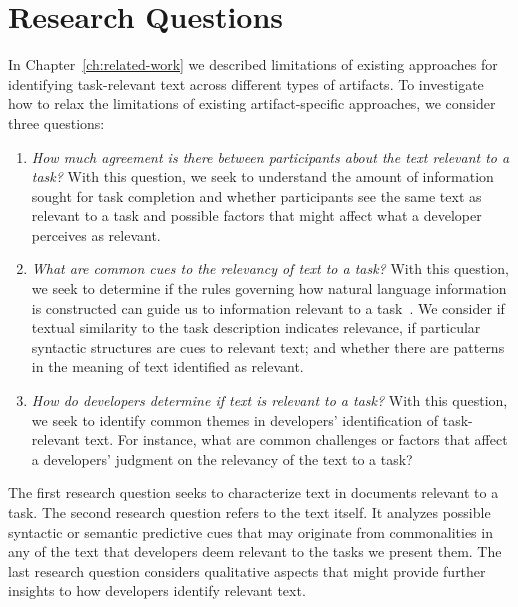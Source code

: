 \section{Research Questions}
\label{cp3:method}



In Chapter~\ref{ch:related-work} we described limitations 
of existing approaches for identifying task-relevant 
text across different types of artifacts. 
To investigate how to relax the limitations of
existing artifact-specific approaches, we consider three questions:


\begin{enumerate}[label=\textit{RQ\arabic*},leftmargin=*]

    \item \textit{How much agreement is there between participants about the text
    relevant to a task?} With this question, we seek to understand
    the amount of information sought for task completion
    and whether participants see the same text as
    relevant to a task and possible factors that might affect what a developer perceives as relevant.

    \item \textit{What are common cues to the relevancy of text to a task?}
    With this question, we seek to determine if the rules governing how natural language information
    is constructed can guide us to information relevant to a task~\cite{Kintsch1978a}.
    We consider if textual similarity to the task description indicates relevance, if
  particular  syntactic structures are cues to relevant text; and whether there
    are patterns in the meaning of text identified as relevant.

    \item \textit{How do developers determine if text is relevant to a task?}
    With this question, we seek to identify common themes in developers' identification of task-relevant text. For instance, what are common challenges or factors that affect a developers' judgment on the relevancy of the text to a task?

\end{enumerate}



The first research question seeks to characterize text
in documents relevant to a task.
The second research question refers to the text itself.
It analyzes possible syntactic or semantic
predictive cues that may originate from commonalities in any of the text that developers deem relevant to the tasks we present them.
The last research question considers qualitative aspects that might provide
further insights to how developers identify relevant text.

